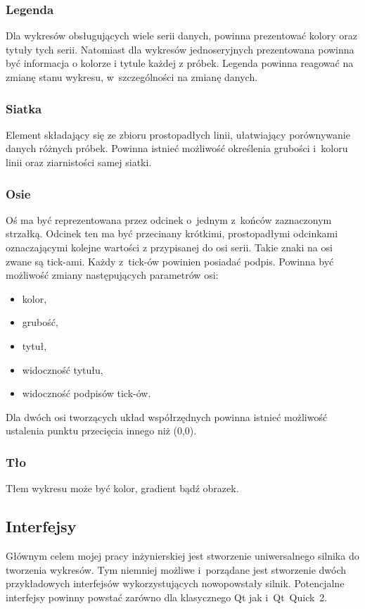 \documentclass[11pt,twoside,a4paper,final]{article}
\begin{document}
\subsubsection{Legenda}
Dla wykresów obsługujących wiele serii danych, powinna prezentować kolory oraz tytuły tych serii.
Natomiast dla wykresów jednoseryjnych prezentowana powinna być informacja o kolorze i tytule każdej z próbek. Legenda powinna reagować na zmianę stanu wykresu, w~szczególności na zmianę danych.

\subsubsection{Siatka}
Element składający się ze zbioru prostopadłych linii, ułatwiający porównywanie danych różnych próbek. Powinna istnieć możliwość określenia grubości i~koloru linii oraz ziarnistości samej siatki.

\subsubsection{Osie}
Oś ma być reprezentowana przez odcinek o~jednym z~końców zaznaczonym strzałką. Odcinek ten ma być przecinany krótkimi, prostopadłymi odcinkami oznaczającymi kolejne wartości z przypisanej do osi serii. Takie znaki na osi zwane są tick-ami. Każdy z~tick-ów powinien posiadać podpis.
Powinna być możliwość zmiany następujących parametrów osi:
\begin{itemize}
\item{kolor,}
\item{grubość,}
\item{tytuł,}
\item{widoczność tytułu,}
\item{widoczność podpisów tick-ów.}
\end{itemize}

Dla dwóch osi tworzących układ współrzędnych powinna istnieć możliwość ustalenia punktu przecięcia innego niż (0,0). 

\subsubsection{Tło}
Tłem wykresu może być kolor, gradient bądź obrazek.

\subsection{Interfejsy}
Głównym celem mojej pracy inżynierskiej jest stworzenie uniwersalnego silnika do tworzenia wykresów. Tym niemniej możliwe i~porządane jest stworzenie dwóch przykładowych interfejsów wykorzystujących nowopowstały silnik. Potencjalne interfejsy powinny powstać zarówno dla klasycznego Qt jak i~Qt~Quick~2. 
\end{document}
